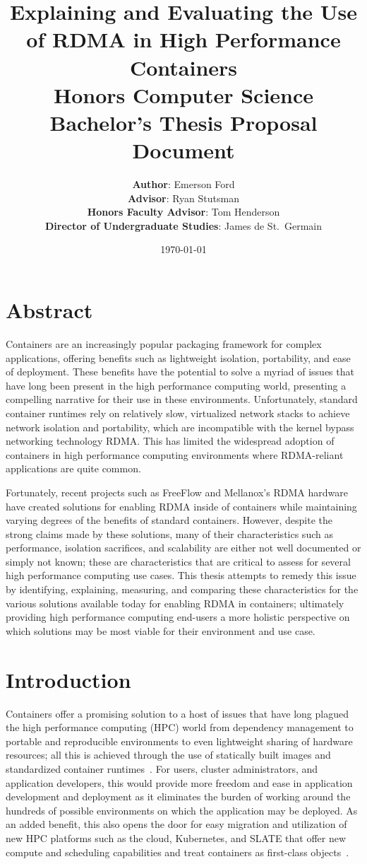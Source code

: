 \documentclass[12pt,titlepage]{article}
\title{\Large\textbf{Explaining and Evaluating the Use of RDMA in High Performance Containers} \\
Honors Computer Science Bachelor's Thesis Proposal Document}
\author{\textbf{Author}: Emerson Ford \\
\textbf{Advisor}: Ryan Stutsman \\
\textbf{Honors Faculty Advisor}: Tom Henderson \\
\textbf{Director of Undergraduate Studies}: James de St.\ Germain }
\date{\today}
\begin{document}
\maketitle


\section*{Abstract}
Containers are an increasingly popular packaging framework for complex applications, offering benefits such as lightweight isolation, portability, and ease of deployment.
These benefits have the potential to solve a myriad of issues that have long been present in the high performance computing world, presenting a compelling narrative for their use in these environments.
Unfortunately, standard container runtimes rely on relatively slow, virtualized network stacks to achieve network isolation and portability, which are incompatible with the kernel bypass networking technology RDMA\@.
This has limited the widespread adoption of containers in high performance computing environments where RDMA-reliant applications are quite common.

Fortunately, recent projects such as FreeFlow and Mellanox's RDMA hardware have created solutions for enabling RDMA inside of containers while maintaining varying degrees of the benefits of standard containers.
However, despite the strong claims made by these solutions, many of their characteristics such as performance, isolation sacrifices, and scalability are either not well documented or simply not known; these are characteristics that are critical to assess for several high performance computing use cases.
This thesis attempts to remedy this issue by identifying, explaining, measuring, and comparing these characteristics for the various solutions available today for enabling RDMA in containers;
ultimately providing high performance computing end-users a more holistic perspective on which solutions may be most viable for their environment and use case.

\section{Introduction}
Containers offer a promising solution to a host of issues that have long plagued the high performance computing (HPC) world from dependency management to portable and reproducible environments to even lightweight sharing of hardware resources;
all this is achieved through the use of statically built images and standardized container runtimes~\cite{containershpc}.
For users, cluster administrators, and application developers, this would provide more freedom and ease in application development and deployment as it eliminates the burden of working around the hundreds of possible environments on which the application may be deployed.
As an added benefit, this also opens the door for easy migration and utilization of new HPC platforms such as the cloud, Kubernetes, and SLATE that offer new compute and scheduling capabilities and treat containers as first-class objects~\cite{slatepaper}.
\end{document}
